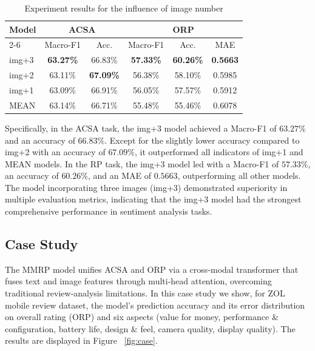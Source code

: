 \documentclass[preprint,12pt]{elsarticle}
\begin{document}
\begin{table}[htp]
	\centering
	\caption{Experiment results for the influence of image number}
	\begin{tabular}{l|cc|ccc}
		\toprule[1.5pt]
		\multicolumn{1}{c|}{Model} & \multicolumn{2}{c|}{ACSA}             & \multicolumn{3}{c}{ORP}                                            \\ \cline{2-6} 
		& \multicolumn{1}{c|}{Macro-F1} & Acc.  & \multicolumn{1}{c|}{Macro-F1} & \multicolumn{1}{c}{Acc.}  & MAE   \\ \hline
		img+3                       & \multicolumn{1}{c|}{\textbf{63.27\%}}    & 66.83\% & \multicolumn{1}{c|}{\textbf{57.33\%}}    & \multicolumn{1}{c|}{\textbf{60.26\%}} & \textbf{0.5663} \\
		img+2                       & \multicolumn{1}{c|}{63.11\%}    & \textbf{67.09\%} & \multicolumn{1}{c|}{56.38\%}    & \multicolumn{1}{c|}{58.10\%}  & 0.5985 \\
		img+1                       & \multicolumn{1}{c|}{63.09\%}    & 66.91\% & \multicolumn{1}{c|}{56.05\%}    & \multicolumn{1}{c|}{57.57\%} & 0.5912 \\
		MEAN                        & \multicolumn{1}{c|}{63.14\%}    & 66.71\% & \multicolumn{1}{c|}{55.48\%}    & \multicolumn{1}{c|}{55.46\%} & 0.6078 \\ \bottomrule[1.5pt]
	\end{tabular}
	\label{table:image_num}
\end{table}

Specifically, in the ACSA task, the img+3 model achieved a Macro-F1 of $63.27\%$ and an accuracy of $66.83\%$. Except for the slightly lower accuracy compared to img+2 with an accuracy of $67.09\%$, it outperformed all indicators of img+1 and MEAN models. In the RP task, the img+3 model led with a Macro-F1 of $57.33\%$, an accuracy of $60.26\%$, and an MAE of $0.5663$, outperforming all other models. The model incorporating three images (img+3) demonstrated superiority in multiple evaluation metrics, indicating that the img+3 model had the strongest comprehensive performance in sentiment analysis tasks.

\subsection{Case Study}

The MMRP model unifies ACSA and ORP via a cross‑modal transformer that fuses text and image features through multi‑head attention, overcoming traditional review‐analysis limitations. In this case study we show, for ZOL mobile review dataset, the model's prediction accuracy and its error distribution  on overall rating (ORP) and six aspects (value for money, performance $\&$ configuration, battery life, design $\&$ feel, camera quality, display quality). The results are displayed in Figure  ~\ref{fig:case}.
\end{document}
